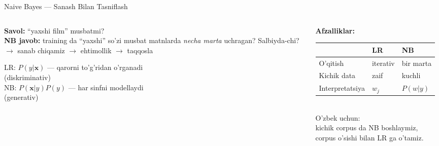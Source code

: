 \documentclass[aspectratio=169,11pt]{beamer}
\begin{document}
\begin{frame}{Naive Bayes --- Sanash Bilan Tasniflash}
  \begin{columns}[T]
    \begin{column}{0.50\textwidth}
      \small
      \textbf{Savol:} ``yaxshi film'' musbatmi?\\[5pt]
      \textbf{NB javob:} training da ``yaxshi'' so'zi
      musbat matnlarda \textit{necha marta} uchragan?
      Salbiyda-chi?\\[5pt]
      $\to$ sanab chiqamiz $\to$ ehtimollik $\to$ taqqosla\\[5pt]
      \begin{tcolorbox}[defbox,title=NB mantiq]
        \small
        LR: $P(y|\mathbf{x})$ --- qarorni to'g'ridan o'rganadi\\
        (diskriminativ)\\[3pt]
        NB: $P(\mathbf{x}|y)P(y)$ --- har sinfni modellaydi\\
        (generativ)
      \end{tcolorbox}
    \end{column}
    \begin{column}{0.46\textwidth}
      \small
      \textbf{Afzalliklar:}\\[4pt]
      \begin{tabular}{@{}lll@{}}
        \toprule
        & LR & NB \\
        \midrule
        O'qitish & iterativ & bir marta \\
        Kichik data & zaif & kuchli \\
        Interpretatsiya & $w_j$ & $P(w|y)$ \\
        \bottomrule
      \end{tabular}
      \vspace{6pt}\\
      \small\textcolor{halfgray}{
        O'zbek uchun:\\
        kichik corpus da NB boshlaymiz,\\
        corpus o'sishi bilan LR ga o'tamiz.}
    \end{column}
  \end{columns}
\end{frame}
\end{document}
